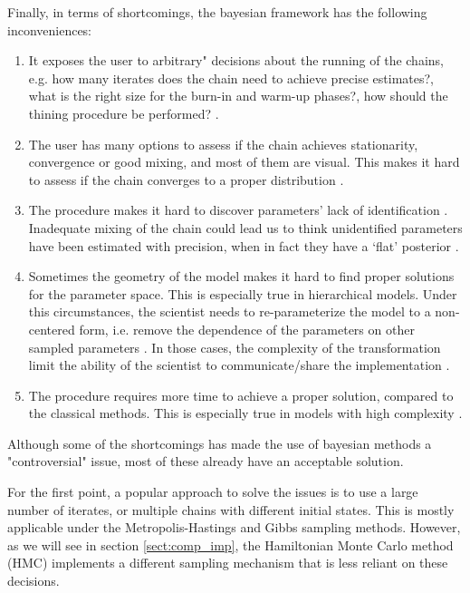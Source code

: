 \noindent Finally, in terms of shortcomings, the bayesian framework has the following inconveniences:

\begin{enumerate}	
	\item It exposes the user to arbitrary" decisions about the running of the chains, e.g. how many iterates does the chain need to achieve precise estimates?, what is the right size for the burn-in and warm-up phases?, how should the thining procedure be performed? \cite{Skrondal_et_al_2004a}. 
	
	\item The user has many options to assess if the chain achieves stationarity, convergence or good mixing, and most of them are visual. This makes it hard to assess if the chain converges to a proper distribution \cite{Gelman_et_al_1996}.
	
	\item The procedure makes it hard to discover parameters' lack of identification \cite{Skrondal_et_al_2004a}. Inadequate mixing of the chain could lead us to think unidentified parameters have been estimated with precision, when in fact they have a `flat' posterior \cite{Keane_1992}.
	
	\item Sometimes the geometry of the model makes it hard to find proper solutions for the parameter space. This is especially true in hierarchical models. Under this circumstances, the scientist needs to re-parameterize the model to a non-centered form, i.e. remove the dependence of the parameters on other sampled parameters \cite{Gorinova_et_al_2019}. In those cases, the complexity of the transformation limit the ability of the scientist to communicate/share the implementation \cite{McElreath_2020}.
	
	\item The procedure requires more time to achieve a proper solution, compared to the classical methods. This is especially true in models with high complexity \cite{Tarazona_2013, Rivera_2019}.
	
\end{enumerate}

\noindent Although some of the shortcomings has made the use of bayesian methods a "controversial" issue, most of these already have an acceptable solution. 

For the first point, a popular approach to solve the issues is to use a large number of iterates, or multiple chains with different initial states. This is mostly applicable under the Metropolis-Hastings and Gibbs sampling methods. However, as we will see in section \ref{sect:comp_imp}, the Hamiltonian Monte Carlo method (HMC) \cite{Betancourt_et_al_2013} implements a different sampling mechanism that is less reliant on these decisions. 

